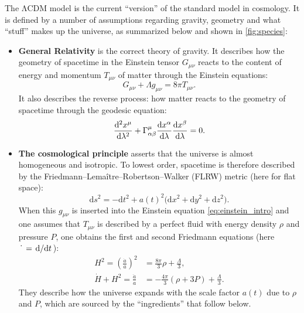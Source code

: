 \documentclass[USenglish, thumbmarks]{uiophdthesis} %
\newcommand\diff{\mathrm{d}}
\newcommand\LCDM{\ensuremath{\mathrm{\Lambda CDM}}}
\newcommand\GR{General Relativity}
\begin{document}
The \LCDM{} model is the current \enquote{version} of the standard model in cosmology.
It is defined by a number of assumptions
regarding gravity, geometry and what \enquote{stuff} makes up the universe,
as summarized below and shown in \cref{fig:species}:
\begin{itemize}
\item \textbf{\GR{}}
is the correct theory of gravity.
It describes how the geometry of spacetime in the Einstein tensor $G_{\mu\nu}$
reacts to the content of energy and momentum $T_{\mu\nu}$ of matter
through the Einstein equations:
\begin{equation}
    G_{\mu\nu} + \Lambda g_{\mu\nu} = 8\pi T_{\mu\nu}.
\label{eq:einstein_intro}
\end{equation}
It also describes the reverse process:
how matter reacts to the geometry of spacetime through the geodesic equation:
\begin{equation}
\odv[order=2]{x^\mu}{\lambda} + \Gamma^\mu_{\alpha\beta} \odv{x^\alpha}{\lambda} \odv{x^\beta}{\lambda} = 0 .
\label{eq:geodesic}
\end{equation}

\item \textbf{The cosmological principle}
asserts that the universe is almost homogeneous and isotropic.
To lowest order, spacetime is therefore described by the
Friedmann--Lemaître--Robertson--Walker (FLRW) metric
(here for flat space):
\begin{equation}
\diff{s}^2 = -\diff{t}^2 + a(t)^2 \big( \diff{x}^2 + \diff{y}^2 + \diff{z}^2 \big).
\label{eq:flrw}
\end{equation}
When this $g_{\mu\nu}$ is inserted into the Einstein equation \eqref{eq:einstein_intro}
and one assumes that $T_{\mu\nu}$ is described by a perfect fluid with energy density $\rho$ and pressure $P$,
one obtains the first and second Friedmann equations
(here $\dot{\phantom{x}} = \odv{}/{t}$):
\begin{subequations}
\label{eq:fried}
\begin{align}
    H^2 = \left( \frac{\dot{a}}{a} \right)^2 &= \frac{8\pi}{3} \rho + \frac{\Lambda}{3}, \label{eq:fried1} \\
    \dot{H} + H^2 = \frac{\ddot{a}}{a} &= - \frac{4\pi}{3} (\rho + 3P) + \frac{\Lambda}{3}. \label{eq:fried2}
\end{align}
\end{subequations}
They describe how the universe expands with the scale factor $a(t)$ due to $\rho$ and $P$,
which are sourced by the \enquote{ingredients} that follow below.


\end{itemize}
\end{document}
